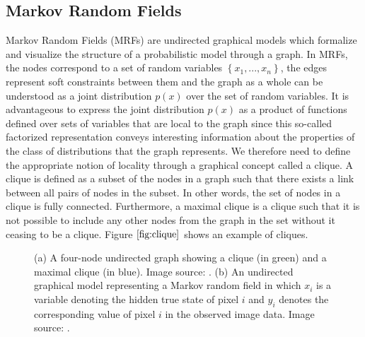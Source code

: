 \documentclass{SMBV12}
\begin{document}
\subsection{Markov Random Fields}
\label{sec:mrf}
Markov Random Fields (MRFs) are undirected graphical models which formalize and visualize the structure of a probabilistic model through a graph. In MRFs, the nodes correspond to a set of random variables $\left\lbrace x_1, ..., x_n\right\rbrace $, the edges represent soft constraints between them and the graph as a whole can be understood as a joint distribution $p(x)$ over the set of random variables. It is advantageous to express the joint distribution $p(x)$ as a product of functions defined over sets of variables that are local to the graph since this so-called factorized representation conveys interesting information about the properties of the class of distributions that the graph represents. We therefore need to define the appropriate notion of locality through a graphical concept called a clique. A clique is defined as a subset of the nodes in a graph such that there exists a link between all pairs of nodes in the subset. In other words, the set of nodes in a clique is fully connected. Furthermore, a maximal clique is a clique such that it is not possible to include any
other nodes from the graph in the set without it ceasing to be a clique. Figure $\ref{fig:clique}$ shows an example of cliques.
\begin{figure}[htbp]
    \centering
    \caption{(a) A four-node undirected graph showing a clique (in green) and a maximal clique (in blue). Image source: \cite{bishop2006pattern}. (b) An undirected graphical model representing a Markov random field in which $x_i$ is a variable denoting the hidden true state of pixel $i$ and $y_i$ denotes the corresponding value of pixel $i$ in the observed image data. Image source: \cite{bishop2006pattern}.}
\end{figure}
\end{document}
